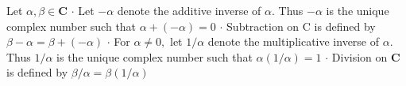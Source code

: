 


Let $\alpha, \beta \in \mathbf{C}$
$\cdot$ Let $-\alpha$ denote the additive inverse of $\alpha .$ Thus $-\alpha$ is the unique complex number such that
$
\alpha+(-\alpha)=0
$
$\cdot$ Subtraction on $\mathrm{C}$ is defined by
$
\beta-\alpha=\beta+(-\alpha)
$
$\cdot$ For $\alpha \neq 0,$ let $1 / \alpha$ denote the multiplicative inverse of $\alpha .$ Thus $1 / \alpha$ is the unique complex number such that
$
\alpha(1 / \alpha)=1
$
$\cdot$ Division on $\mathbf{C}$ is defined by
$
\beta / \alpha=\beta(1 / \alpha)
$

